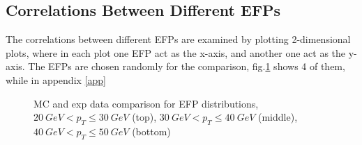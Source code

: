 \documentclass[12pt]{article}
\begin{document}
\subsection{Correlations Between Different EFPs}
The correlations between different EFPs are examined by plotting 2-dimensional plots, where in each plot one EFP act as the x-axis, and another one act as the y-axis. The EFPs are chosen randomly for the comparison, fig.\ref{fig:2d} shows 4 of them, while in appendix \ref{app}
\begin{figure}[htbp]
\begin{center}
\caption{MC and exp data comparison for EFP distributions, $20 \ GeV < p_T \leq 30 \ GeV$ (top), $30 \ GeV < p_T \leq 40 \ GeV$ (middle), $40 \ GeV < p_T \leq 50 \ GeV$ (bottom)}
\label{fig:2d}
\end{center}
\end{figure}
\end{document}

